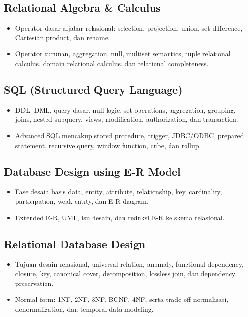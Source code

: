 \documentclass[11pt,a4paper]{article}
\begin{document}
\subsection{Relational Algebra \& Calculus}
\begin{itemize}
    \item Operator dasar aljabar relasional: selection, projection, union, set difference, Cartesian product, dan rename.
    \item Operator turunan, aggregation, null, multiset semantics, tuple relational calculus, domain relational calculus, dan relational completeness.
\end{itemize}

\subsection{SQL (Structured Query Language)}
\begin{itemize}
    \item DDL, DML, query dasar, null logic, set operations, aggregation, grouping, joins, nested subquery, views, modification, authorization, dan transaction.
    \item Advanced SQL mencakup stored procedure, trigger, JDBC/ODBC, prepared statement, recursive query, window function, cube, dan rollup.
\end{itemize}

\subsection{Database Design using E-R Model}
\begin{itemize}
    \item Fase desain basis data, entity, attribute, relationship, key, cardinality, participation, weak entity, dan E-R diagram.
    \item Extended E-R, UML, isu desain, dan reduksi E-R ke skema relasional.
\end{itemize}

\subsection{Relational Database Design}
\begin{itemize}
    \item Tujuan desain relasional, universal relation, anomaly, functional dependency, closure, key, canonical cover, decomposition, lossless join, dan dependency preservation.
    \item Normal form: 1NF, 2NF, 3NF, BCNF, 4NF, serta trade-off normalisasi, denormalization, dan temporal data modeling.
\end{itemize}
\end{document}
